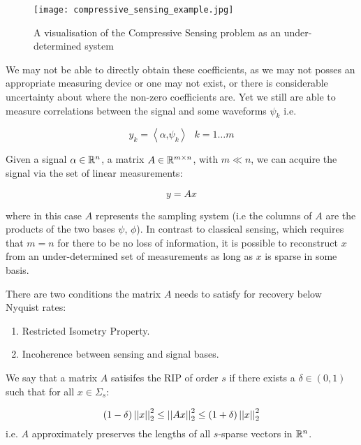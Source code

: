 \begin{figure*}[h]
\centering
\texttt{[image: compressive\_sensing\_example.jpg]}
\caption{A visualisation of the Compressive Sensing problem as an under-determined system}
\label{l1l2}
\end{figure*}


We may not be able to directly obtain these coefficients, as we may not posses an appropriate measuring device or one may not exist, or there is considerable uncertainty about where the non-zero coefficients are. Yet we still are able to measure correlations between the signal and some waveforms \(\psi_{k}\) i.e. 

\begin{equation}
y_{k} = \left\langle \alpha \text{,} \psi_{k} \right\rangle \text{ } k = 1 \ldots m
\end{equation}


Given a signal \(\alpha \in {\mathbb{R}}^n\), a matrix \(A \in {\mathbb{R}}^{m \times n}\), with \(m \ll n\),  we can acquire the signal via the set of linear measurements:

\begin{equation}
y = Ax
\end{equation}

where in this case \(A\) represents the sampling system (i.e the columns of \(A\) are the products of the two bases \(\psi\), \(\phi\)). In contrast to classical sensing, which requires that \(m = n\) for there to be no loss of information, it is possible to reconstruct \(x\) from an under-determined set of measurements as long as \(x\) is sparse in some basis. 

There are two conditions the matrix \(A\) needs to satisfy for recovery below Nyquist rates:

\begin{enumerate}
\item Restricted Isometry Property.
\item Incoherence between sensing and signal bases.
\end{enumerate}

\begin{definition}[RIP]\label{def:RIP}
We say that a matrix \(A\) satisifes the RIP of order \(s\) if there exists a \(\delta \in \left(0, 1\right)\) such that for all \(x \in \Sigma_s\):

\begin{equation}
\left(1 - \delta\right) \left|\left|x\right|\right|_2^2 \leq \left|\left|Ax\right|\right|_2^2 \leq \left(1 + \delta\right) \left|\left|x\right|\right|_2^2
\end{equation}
i.e. \(A\) approximately preserves the lengths of all \(s\)-sparse vectors in \({\mathbb{R}}^n\). 
\label{def:RIP}
\end{definition}

